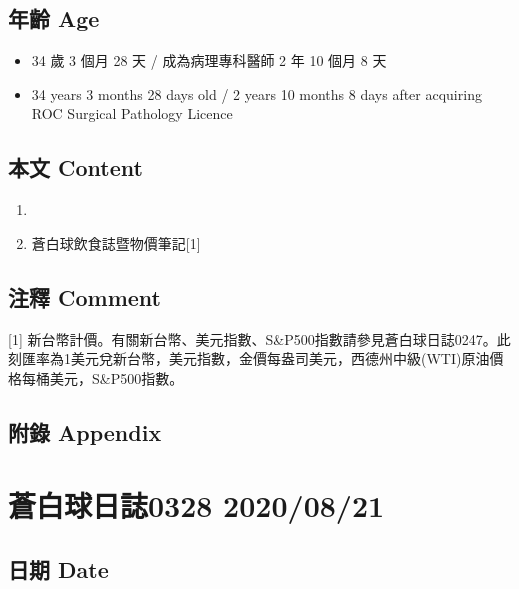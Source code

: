 \documentclass[a5paper, 11pt
]{book}
\providecommand{\tightlist}{%
  \setlength{\itemsep}{0pt}\setlength{\parskip}{0pt}}
\begin{document}
\hypertarget{ux5e74ux9f61-age-80}{%
\subsection{年齡 Age}\label{ux5e74ux9f61-age-80}}

\begin{itemize}
\tightlist
\item
  34 歲 3 個月 28 天 / 成為病理專科醫師 2 年 10 個月 8 天
\item
  34 years 3 months 28 days old / 2 years 10 months 8 days after
  acquiring ROC Surgical Pathology Licence
\end{itemize}

\hypertarget{ux672cux6587-content-80}{%
\subsection{本文 Content}\label{ux672cux6587-content-80}}

\begin{enumerate}
\def\labelenumi{\arabic{enumi}.}
\tightlist
\item
\item
  蒼白球飲食誌暨物價筆記{[}1{]}
\end{enumerate}

\hypertarget{ux6ce8ux91cb-comment-80}{%
\subsection{注釋 Comment}\label{ux6ce8ux91cb-comment-80}}

{[}1{]}
新台幣計價。有關新台幣、美元指數、S\&P500指數請參見蒼白球日誌0247。此刻匯率為1美元兌新台幣，美元指數，金價每盎司美元，西德州中級(WTI)原油價格每桶美元，S\&P500指數。

\hypertarget{ux9644ux9304-appendix-80}{%
\subsection{附錄 Appendix}\label{ux9644ux9304-appendix-80}}

\hypertarget{ux84bcux767dux7403ux65e5ux8a8c0328-20200821}{%
\section{蒼白球日誌0328
2020/08/21}\label{ux84bcux767dux7403ux65e5ux8a8c0328-20200821}}

\hypertarget{ux65e5ux671f-date-81}{%
\subsection{日期 Date}\label{ux65e5ux671f-date-81}}
\end{document}
